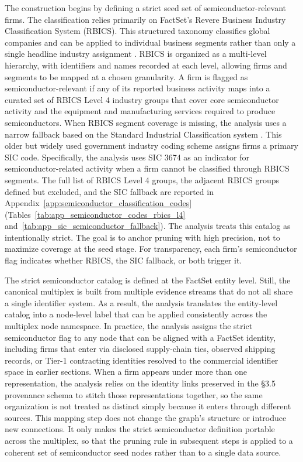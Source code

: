 The construction begins by defining a strict seed set of semiconductor-relevant firms. The classification relies primarily on FactSet's Revere Business Industry Classification System (RBICS). This structured taxonomy classifies global companies and can be applied to individual business segments rather than only a single headline industry assignment \parencite{factset_standard_2021}. RBICS is organized as a multi-level hierarchy, with identifiers and names recorded at each level, allowing firms and segments to be mapped at a chosen granularity. A firm is flagged as semiconductor-relevant if any of its reported business activity maps into a curated set of RBICS Level 4 industry groups that cover core semiconductor activity and the equipment and manufacturing services required to produce semiconductors. When RBICS segment coverage is missing, the analysis uses a narrow fallback based on the Standard Industrial Classification system \parencite{omb_sic_manual_1987}. This older but widely used government industry coding scheme assigns firms a primary SIC code. Specifically, the analysis uses SIC 3674 as an indicator for semiconductor-related activity when a firm cannot be classified through RBICS segments. The full list of RBICS Level 4 groups, the adjacent RBICS groups defined but excluded, and the SIC fallback are reported in Appendix~\ref{app:semiconductor_classification_codes} (Tables~\ref{tab:app_semiconductor_codes_rbics_l4} and~\ref{tab:app_sic_semiconductor_fallback}). The analysis treats this catalog as intentionally strict. The goal is to anchor pruning with high precision, not to maximize coverage at the seed stage. For transparency, each firm's semiconductor flag indicates whether RBICS, the SIC fallback, or both trigger it.

The strict semiconductor catalog is defined at the FactSet entity level. Still, the canonical multiplex is built from multiple evidence streams that do not all share a single identifier system. As a result, the analysis translates the entity-level catalog into a node-level label that can be applied consistently across the multiplex node namespace. In practice, the analysis assigns the strict semiconductor flag to any node that can be aligned with a FactSet identity, including firms that enter via disclosed supply-chain ties, observed shipping records, or Tier-1 contracting identities resolved to the commercial identifier space in earlier sections. When a firm appears under more than one representation, the analysis relies on the identity links preserved in the \S3.5 provenance schema to stitch those representations together, so the same organization is not treated as distinct simply because it enters through different sources. This mapping step does not change the graph's structure or introduce new connections. It only makes the strict semiconductor definition portable across the multiplex, so that the pruning rule in subsequent steps is applied to a coherent set of semiconductor seed nodes rather than to a single data source.

